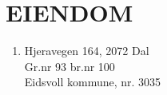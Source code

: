 \section{EIENDOM}


    \begin{enumerate}


        \item Hjeravegen 164, 2072 Dal\\Gr.nr 93 br.nr 100\\Eidsvoll kommune, nr. 3035

    \end{enumerate}

